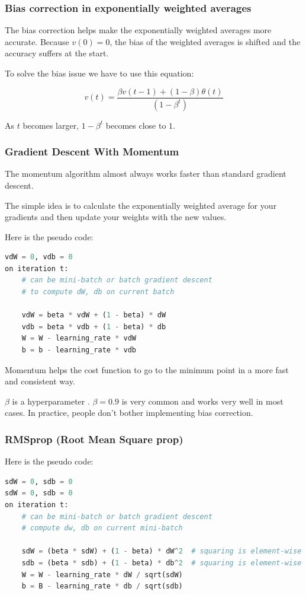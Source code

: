 \subsubsection{Bias correction in exponentially weighted averages}
The bias correction helps make the exponentially weighted averages more accurate. Because $v(0)=0$, the bias of the weighted averages is shifted and the accuracy suffers at the start.

To solve the bias issue we have to use this equation:

\begin{equation}
    v(t) = \frac{\beta v(t-1) + (1 - \beta) \theta(t)}{(1 - \beta^t)}
\end{equation}

As $t$ becomes larger, $1 - \beta^t$ becomes close to $1$.

\subsubsection{Gradient Descent With Momentum}
The momentum algorithm almost always works faster than standard gradient descent.

The simple idea is to calculate the exponentially weighted average for your gradients and then update your weights with the new values.

Here is the pseudo code:

\begin{lstlisting}[language=python]
vdW = 0, vdb = 0
on iteration t:
    # can be mini-batch or batch gradient descent
    # to compute dW, db on current batch
    
    vdW = beta * vdW + (1 - beta) * dW
    vdb = beta * vdb + (1 - beta) * db
    W = W - learning_rate * vdW
    b = b - learning_rate * vdb
\end{lstlisting}

Momentum helps the cost function to go to the minimum point in a more fast and consistent way.

$\beta$ is a hyperparameter . $\beta = 0.9$ is very common and works very well in most cases. In practice, people don't bother implementing bias correction.

\subsubsection{RMSprop (Root Mean Square prop)}
Here is the pseudo code:
\begin{lstlisting}[language=python]
sdW = 0, sdb = 0
sdW = 0, sdb = 0
on iteration t:
    # can be mini-batch or batch gradient descent
    # compute dw, db on current mini-batch
    
    sdW = (beta * sdW) + (1 - beta) * dW^2  # squaring is element-wise
    sdb = (beta * sdb) + (1 - beta) * db^2  # squaring is element-wise
    W = W - learning_rate * dW / sqrt(sdW)
    b = B - learning_rate * db / sqrt(sdb)
\end{lstlisting}

